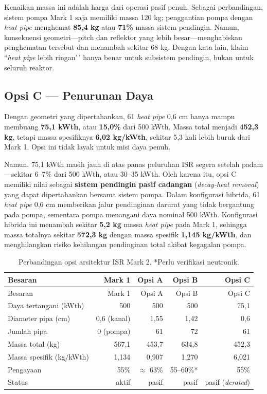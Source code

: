 \documentclass[
  indonesian,
  12pt,
  a4paper,
]{report}
\begin{document}
Kenaikan massa ini adalah harga dari operasi pasif penuh. Sebagai
perbandingan, sistem pompa Mark 1 saja memiliki massa 120 kg;
penggantian pompa dengan \emph{heat pipe} menghemat \textbf{85,4 kg}
atau \textbf{71\%} massa sistem pendingin. Namun, konsekuensi
geometri---pitch dan reflektor yang lebih besar---menghabiskan
penghematan tersebut dan menambah sekitar 68 kg. Dengan kata lain, klaim
``\emph{heat pipe} lebih ringan'\,' hanya benar untuk subsistem
pendingin, bukan untuk seluruh reaktor.

\subsection{Opsi C --- Penurunan Daya}\label{opsi-c-penurunan-daya}

Dengan geometri yang dipertahankan, 61 \emph{heat pipe} 0,6 cm hanya
mampu membuang \textbf{75,1 kWth}, atau \textbf{15,0\%} dari 500 kWth.
Massa total menjadi \textbf{452,3 kg}, tetapi massa spesifiknya
\textbf{6,02 kg/kWth}, sekitar 5,3 kali lebih buruk dari Mark 1. Opsi
ini tidak layak untuk misi daya penuh.

Namun, 75,1 kWth masih jauh di atas panas peluruhan ISR segera setelah
padam---sekitar 6--7\% dari 500 kWth, atau 30--35 kWth. Oleh karena itu,
opsi C memiliki nilai sebagai \textbf{sistem pendingin pasif cadangan}
(\emph{decay-heat removal}) yang dapat dipertahankan bersama sistem
pompa. Dalam konfigurasi hibrida, 61 \emph{heat pipe} 0,6 cm memberikan
jalur pendinginan darurat yang tidak bergantung pada pompa, sementara
pompa menangani daya nominal 500 kWth. Konfigurasi hibrida ini menambah
sekitar \textbf{5,2 kg} massa \emph{heat pipe} pada Mark 1, sehingga
massa totalnya sekitar \textbf{572,3 kg} dengan massa spesifik
\textbf{1,145 kg/kWth}, dan menghilangkan risiko kehilangan pendinginan
total akibat kegagalan pompa.

\begin{longtable}[]{@{}lrrrr@{}}
\caption{Perbandingan opsi arsitektur ISR Mark 2. *Perlu verifikasi
neutronik.}\label{tbl-opsi}\tabularnewline
\toprule\noalign{}
Besaran & Mark 1 & Opsi A & Opsi B & Opsi C \\
\midrule\noalign{}
\endfirsthead
\toprule\noalign{}
Besaran & Mark 1 & Opsi A & Opsi B & Opsi C \\
\midrule\noalign{}
\endhead
\bottomrule\noalign{}
\endlastfoot
Daya tertangani (kWth) & 500 & 500 & 500 & 75,1 \\
Diameter pipa (cm) & 0,6 (kanal) & 1,55 & 1,42 & 0,6 \\
Jumlah pipa & 0 (pompa) & 61 & 72 & 61 \\
Massa total (kg) & 567,1 & 453,7 & 634,8 & 452,3 \\
Massa spesifik (kg/kWth) & 1,134 & 0,907 & 1,270 & 6,021 \\
Pengayaan & 55\% & \(\approx\) 63\% & 55--60\%* & 55\% \\
Status & aktif & pasif & pasif & pasif (\emph{derated}) \\
\end{longtable}
\end{document}
